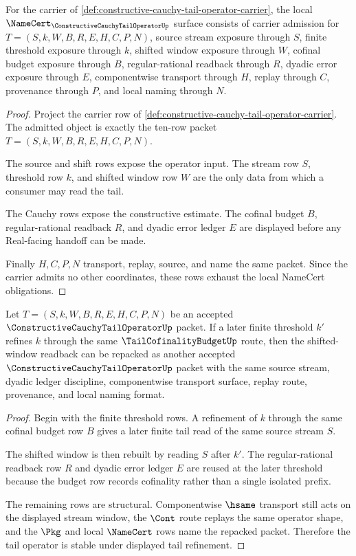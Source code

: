 \begin{theorem}
\label{thm:constructive-cauchy-tail-operator-namecert-obligations}
For the carrier of \autoref{def:constructive-cauchy-tail-operator-carrier}, the local $\NameCert_{\ConstructiveCauchyTailOperatorUp}$ surface consists of carrier admission for $T=(S,k,W,B,R,E,H,C,P,N)$, source stream exposure through $S$, finite threshold exposure through $k$, shifted window exposure through $W$, cofinal budget exposure through $B$, regular-rational readback through $R$, dyadic error exposure through $E$, componentwise transport through $H$, replay through $C$, provenance through $P$, and local naming through $N$.
\end{theorem}
\begin{proof}
Project the carrier row of \autoref{def:constructive-cauchy-tail-operator-carrier}. The admitted object is exactly the ten-row packet $T=(S,k,W,B,R,E,H,C,P,N)$.

The source and shift rows expose the operator input. The stream row $S$, threshold row $k$, and shifted window row $W$ are the only data from which a consumer may read the tail.

The Cauchy rows expose the constructive estimate. The cofinal budget $B$, regular-rational readback $R$, and dyadic error ledger $E$ are displayed before any Real-facing handoff can be made.

Finally $H,C,P,N$ transport, replay, source, and name the same packet. Since the carrier admits no other coordinates, these rows exhaust the local NameCert obligations.
\end{proof}

\begin{theorem}
\label{thm:constructive-cauchy-tail-operator-shift-stability}
Let $T=(S,k,W,B,R,E,H,C,P,N)$ be an accepted $\ConstructiveCauchyTailOperatorUp$ packet. If a later finite threshold $k'$ refines $k$ through the same $\TailCofinalityBudgetUp$ route, then the shifted-window readback can be repacked as another accepted $\ConstructiveCauchyTailOperatorUp$ packet with the same source stream, dyadic ledger discipline, componentwise transport surface, replay route, provenance, and local naming format.
\end{theorem}
\begin{proof}
Begin with the finite threshold rows. A refinement of $k$ through the same cofinal budget row $B$ gives a later finite tail read of the same source stream $S$.

The shifted window is then rebuilt by reading $S$ after $k'$. The regular-rational readback row $R$ and dyadic error ledger $E$ are reused at the later threshold because the budget row records cofinality rather than a single isolated prefix.

The remaining rows are structural. Componentwise $\hsame$ transport still acts on the displayed stream window, the $\Cont$ route replays the same operator shape, and the $\Pkg$ and local $\NameCert$ rows name the repacked packet. Therefore the tail operator is stable under displayed tail refinement.
\end{proof}

